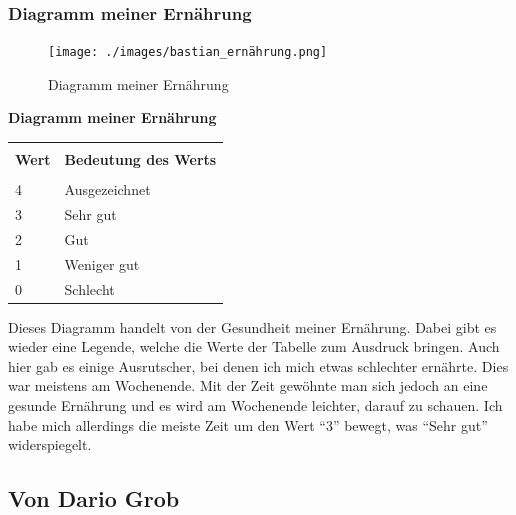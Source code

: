 \subsubsection{Diagramm meiner Ernährung}
\begin{figure}[H]
  \centering
  \texttt{[image: ./images/bastian\_ernährung.png]}
  \caption{Diagramm meiner Ernährung}
\end{figure}
\textbf{Diagramm meiner Ernährung}
\newline
\begin{table}[htp]
  \begin{tabularx}{\textwidth}{l X}\hline \\
    \textbf{Wert} & \textbf{Bedeutung des Werts}  \\\hline \\
    4 & Ausgezeichnet \\
    3 & Sehr gut \\
    2 & Gut \\
    1 & Weniger gut \\
    0 & Schlecht
    \\\hline
  \end{tabularx}
\end{table}
\newline
Dieses Diagramm handelt von der Gesundheit meiner Ernährung. Dabei gibt es wieder eine Legende, welche die Werte der Tabelle zum Ausdruck bringen. Auch hier gab es einige Ausrutscher, bei denen ich mich etwas schlechter ernährte. Dies war meistens am Wochenende. Mit der Zeit gewöhnte man sich jedoch an eine gesunde Ernährung und es wird am Wochenende leichter, darauf zu schauen. Ich habe mich allerdings die meiste Zeit um den Wert “3” bewegt, was “Sehr gut” widerspiegelt.
\subsection{Von Dario Grob}
\authortoc{\dario}{\subsectionident}
